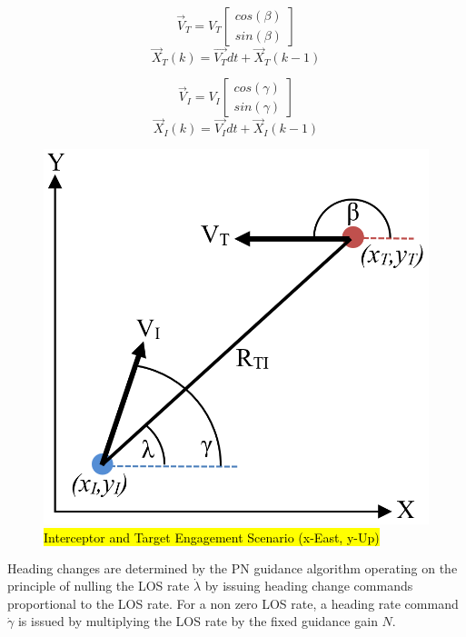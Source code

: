 \documentclass[conference]{IEEEtran}
\begin{document}
\begin{equation}\label{eq:targetkin}
\overrightarrow{V}_{T} =  V_{T} \begin{bmatrix} cos(\beta) \\ sin(\beta) \end{bmatrix}
\end{equation}
\begin{equation}\label{eq:targetkintwo}
\overrightarrow{X}_T(k) =  \overrightarrow{V_T}dt + \overrightarrow{X}_T(k-1) 
\end{equation}

\begin{equation}\label{eq:intkin}
\overrightarrow{V}_{I} =  V_{I} \begin{bmatrix} cos(\gamma) \\ sin(\gamma) \end{bmatrix}
\end{equation}
\begin{equation}\label{eq:intkintwo}
\overrightarrow{X}_I(k) =  \overrightarrow{V_I}dt + \overrightarrow{X}_I(k-1) 
\end{equation}





\begin{figure}[H]
	\centering
	\includegraphics[width=6 cm]{Engagement_Model.PNG}
	\caption{\hl{Interceptor and Target Engagement Scenario (x-East, y-Up)}}
	\label{fig:Egagement}
\end{figure}

 Heading changes are determined by the PN guidance algorithm operating on the principle of nulling the LOS rate $\dot{\lambda}$ by issuing heading change commands proportional to the LOS rate. For a non zero LOS rate, a heading rate command $\dot{\gamma}$ is issued by multiplying the LOS rate by the fixed guidance gain $N$.
\end{document}
